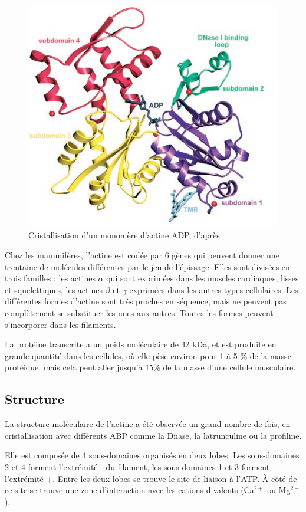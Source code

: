 \begin{figure}
\includegraphics[scale=0.7]{Actine_dominguez.png}
\caption{Cristallisation d'un monomère d'actine ADP, d'après \cite{otterbein_crystal_2001}}
\end{figure}

Chez les mammifères, l'actine est codée par 6 gènes qui peuvent donner une trentaine de molécules différentes par le jeu de l'épissage. 
Elles sont divisées en trois familles : les actines $\alpha$ qui sont exprimées dans les muscles cardiaques, lisses et squelettiques, les actines $\beta$ et $\gamma$ exprimées dans les autres types cellulaires.
Les différentes formes d'actine sont très proches en séquence, mais ne peuvent pas complètement se substituer les unes aux autres. Toutes les formes peuvent s'incorporer dans les filaments. 

La protéine transcrite a un poids moléculaire de 42 kDa, et est produite en grande quantité dans les cellules, où elle pèse environ pour 1 à 5 \% de la masse protéique, mais cela peut aller jusqu'à 15\% de la masse d'une cellule musculaire. 

\subsection{Structure}
La structure moléculaire de l'actine a été observée un grand nombre de fois, en cristallisation avec différents ABP comme la Dnase, la latrunculine ou la profiline. 


Elle est composée de 4 sous-domaines organisés en deux lobes. Les sous-domaines 2 et 4 forment l'extrémité - du filament, les sous-domaines 1 et 3 forment l'extrémité +. Entre les deux lobes se trouve le site de liaison à l'ATP. 
À côté de ce site se trouve une zone d'interaction avec les cations divalents (Ca$^{2+}$ ou Mg$^{2+}$). 

